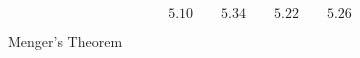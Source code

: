 
\begin{frame}{}

  \pause
  \[
    5.10 \qquad 5.34 \qquad 5.22 \qquad 5.26
  \]

  \pause
  \begin{center}
    Menger's Theorem {\small {}}
  \end{center}
\end{frame}
